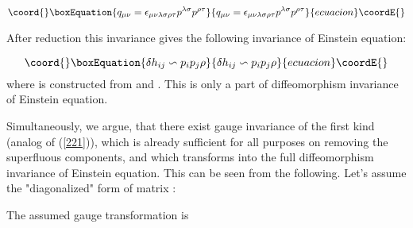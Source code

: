 \documentclass[a4paper,12pt]{article}
\begin{document}
\begin{equation}\coord{}\boxEquation{
q_{\mu \nu }=\epsilon _{\mu \nu \lambda \sigma \rho \tau }p^{\lambda \sigma
}p^{\rho \tau }
}{
q_{\mu \nu }=\epsilon _{\mu \nu \lambda \sigma \rho \tau }p^{\lambda \sigma
}p^{\rho \tau }
}{ecuacion}\coordE{}\end{equation}

After reduction this invariance gives the following invariance of
Einstein equation:

\begin{equation}\coord{}\boxEquation{
\delta h_{ij}\backsim p_{i}p_{j}\rho
}{
\delta h_{ij}\backsim p_{i}p_{j}\rho
}{ecuacion}\coordE{}\end{equation}
where \myHighlight{$\rho $}\coordHE{} is constructed from \coordHE{} and \myHighlight{$\xi$}\coordHE{}. This is only a
part of diffeomorphism invariance of Einstein equation.

Simultaneously, we argue, that there exist gauge invariance of the
first kind (analog of (\ref{221})), which is already sufficient
for all purposes on removing the superfluous components, and which
transforms into the full diffeomorphism invariance of Einstein
equation. This can be seen from the following. Let's assume the
"diagonalized" form of matrix \coordHE{}:

\coordHE{}

The assumed gauge transformation is
\end{document}

